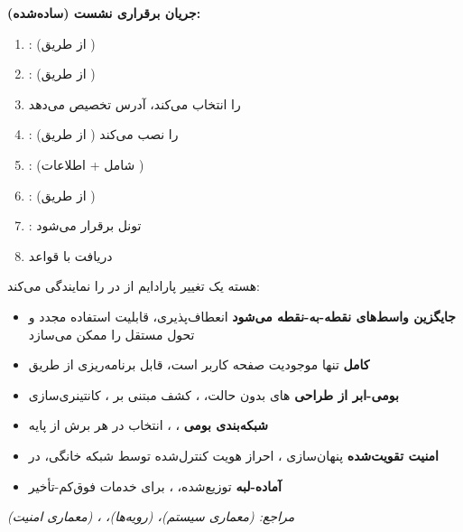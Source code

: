 


\textbf{جریان برقراری نشست  (ساده‌شده):}

\begin{enumerate}
\def\labelenumi{\arabic{enumi}.}
\tightlist
\item
  :  (از طریق )
\item
  :  (از طریق )
\item
   را انتخاب می‌کند، آدرس  تخصیص می‌دهد
\item
  :  (از طریق )   را نصب می‌کند
\item
  :  (شامل  + اطلاعات )
\item
  :  (از طریق )
\item
  : تونل  برقرار می‌شود 
\item
   دریافت  با قواعد 
\end{enumerate}


هسته  یک تغییر پارادایم از  در  را نمایندگی می‌کند:

\begin{itemize}
\tightlist
\item
  \textbf{ جایگزین واسط‌های نقطه-به-نقطه می‌شود}  انعطاف‌پذیری، قابلیت استفاده مجدد و تحول مستقل  را ممکن می‌سازد
\item
  \textbf{ کامل}   تنها موجودیت صفحه کاربر است، قابل برنامه‌ریزی از طریق 
\item
  \textbf{بومی-ابر از طراحی}  های بدون حالت، ، کشف مبتنی بر ، کانتینری‌سازی
\item
  \textbf{شبکه‌بندی بومی}  ، ، انتخاب  در هر برش از پایه
\item
  \textbf{امنیت تقویت‌شده}  پنهان‌سازی ، احراز هویت کنترل‌شده توسط شبکه خانگی،  در 
\item
  \textbf{آماده-لبه}   توزیع‌شده، ،  برای خدمات فوق‌کم-تأخیر
\end{itemize}

\emph{مراجع:  (معماری سیستم)،  (رویه‌ها)، ،  (معماری امنیت)}
